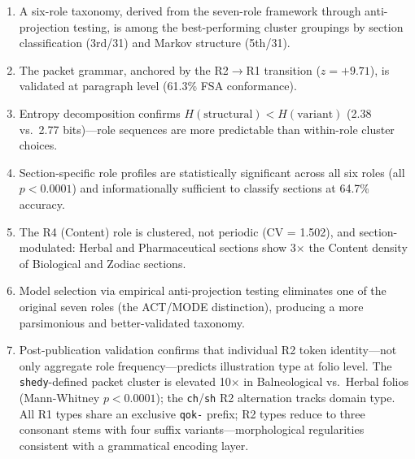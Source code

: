 \documentclass[11pt,a4paper,twocolumn]{article}
\begin{document}
\begin{enumerate}[leftmargin=*,itemsep=2pt]
    \item A six-role taxonomy, derived from the seven-role framework through anti-projection testing, is among the best-performing cluster groupings by section classification (3rd/31) and Markov structure (5th/31).
    \item The packet grammar, anchored by the R2$\to$R1 transition ($z = +9.71$), is validated at paragraph level (61.3\% FSA conformance).
    \item Entropy decomposition confirms $H(\text{structural}) < H(\text{variant})$ (2.38 vs.\ 2.77 bits)---role sequences are more predictable than within-role cluster choices.
    \item Section-specific role profiles are statistically significant across all six roles (all $p < 0.0001$) and informationally sufficient to classify sections at 64.7\% accuracy.
    \item The R4 (Content) role is clustered, not periodic (CV = 1.502), and section-modulated: Herbal and Pharmaceutical sections show 3$\times$ the Content density of Biological and Zodiac sections.
    \item Model selection via empirical anti-projection testing eliminates one of the original seven roles (the ACT/MODE distinction), producing a more parsimonious and better-validated taxonomy.
    \item Post-publication validation confirms that individual R2 token identity---not only aggregate role frequency---predicts illustration type at folio level. The \texttt{shedy}-defined packet cluster is elevated 10$\times$ in Balneological vs.\ Herbal folios (Mann-Whitney $p < 0.0001$); the \texttt{ch}/\texttt{sh} R2 alternation tracks domain type. All R1 types share an exclusive \texttt{qok-} prefix; R2 types reduce to three consonant stems with four suffix variants---morphological regularities consistent with a grammatical encoding layer.

\end{enumerate}
\end{document}
